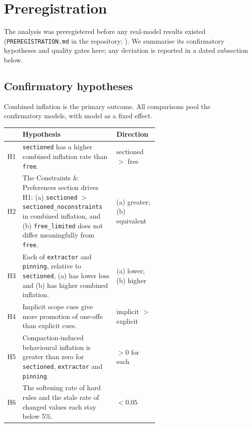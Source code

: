 \section{Preregistration}
\label{app:prereg}

The analysis was preregistered before any real-model results existed
(\texttt{PREREGISTRATION.md} in the repository; ). We
summarise its confirmatory hypotheses and quality gates here; any deviation is reported in a
dated subsection below.

\subsection{Confirmatory hypotheses}
Combined inflation is the primary outcome. All comparisons pool the confirmatory models, with
model as a fixed effect.

\begin{center}\small
\begin{tabular}{lp{0.62\linewidth}l}
\toprule
 & Hypothesis & Direction \\
\midrule
H1 & \texttt{sectioned} has a higher combined inflation rate than \texttt{free}. & sectioned $>$ free \\
H2 & The Constraints \& Preferences section drives H1: (a) \texttt{sectioned} $>$
     \texttt{sectioned\_noconstraints} in combined inflation, and (b) \texttt{free\_limited} does
     not differ meaningfully from \texttt{free}. & (a) greater; (b) equivalent \\
H3 & Each of \texttt{extractor} and \texttt{pinning}, relative to \texttt{sectioned}, (a) has
     lower loss and (b) has higher combined inflation. & (a) lower; (b) higher \\
H4 & Implicit scope cues give more promotion of one-offs than explicit cues. & implicit $>$ explicit \\
H5 & Compaction-induced behavioural inflation is greater than zero for \texttt{sectioned},
     \texttt{extractor} and \texttt{pinning}. & $>0$ for each \\
H6 & The softening rate of hard rules and the stale rate of changed values each stay below 5\%. & $<0.05$ \\
\bottomrule
\end{tabular}
\end{center}

